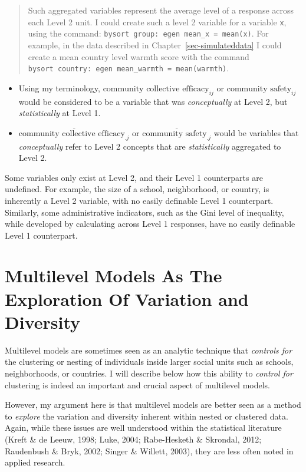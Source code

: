 \documentclass[
  letterpaper,
  DIV=11,
  numbers=noendperiod]{scrreprt}
\begin{document}
\begin{quote}
Such aggregated variables represent the average level of a response
across each Level 2 unit. I could create such a level 2 variable for a
variable \texttt{x}, using the command:
\texttt{bysort\ group:\ egen\ mean\_x\ =\ mean(x)}. For example, in the
data described in Chapter~\ref{sec-simulateddata} I could create a mean
country level warmth score with the command
\texttt{bysort\ country:\ egen\ mean\_warmth\ =\ mean(warmth)}.
\end{quote}

\begin{itemize}
\item
  Using my terminology, \(\text{community collective efficacy}_{ij}\) or
  \(\text{community safety}_{ij}\) would be considered to be a variable
  that was \emph{conceptually} at Level 2, but \emph{statistically} at
  Level 1.
\item
  \(\overline{\text{community collective efficacy}_{.j}}\) or
  \(\overline{\text{community safety}_{.j}}\) would be variables that
  \emph{conceptually} refer to Level 2 concepts that are
  \emph{statistically} aggregated to Level 2.
\end{itemize}

Some variables only exist at Level 2, and their Level 1 counterparts are
undefined. For example, the size of a school, neighborhood, or country,
is inherently a Level 2 variable, with no easily definable Level 1
counterpart. Similarly, some administrative indicators, such as the Gini
level of inequality, while developed by calculating across Level 1
responses, have no easily definable Level 1 counterpart.

\section{Multilevel Models As The Exploration Of Variation and
Diversity}\label{sec-studyvariation}

Multilevel models are sometimes seen as an analytic technique that
\emph{controls for} the clustering or nesting of individuals inside
larger social units such as schools, neighborhoods, or countries. I will
describe below how this ability to \emph{control for} clustering is
indeed an important and crucial aspect of multilevel models.

However, my argument here is that multilevel models are better seen as a
method to \emph{explore} the variation and diversity inherent within
nested or clustered data. Again, while these issues are well understood
within the statistical literature (Kreft \& de Leeuw, 1998; Luke, 2004;
Rabe-Hesketh \& Skrondal, 2012; Raudenbush \& Bryk, 2002; Singer \&
Willett, 2003), they are less often noted in applied research.
\end{document}
